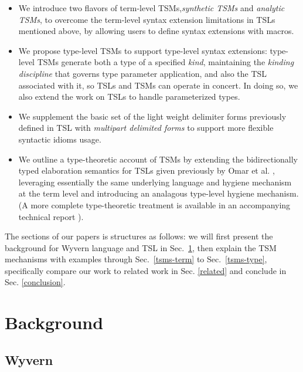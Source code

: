 \documentclass{sig-alternate}[10pt]
\begin{document}
\begin{itemize}[noitemsep]
\item We introduce two flavors of term-level TSMs,\emph{synthetic TSMs} and \emph{analytic TSMs}, to overcome the term-level syntax extension limitations in TSLs mentioned above, by allowing users to define syntax extensions with macros.
\item We propose type-level TSMs to support type-level syntax extensions: type-level TSMs generate both a type of a specified \emph{kind}, maintaining the \emph{kinding discipline} that governs type parameter application, and also the TSL associated with it, so TSLs and TSMs can operate in concert. In doing so, we also extend the work on TSLs to handle parameterized types. %
\item We supplement the basic set of the light weight delimiter forms previously defined in TSL with \emph{multipart delimited forms} to support more flexible syntactic idioms usage.
\item We outline a type-theoretic account of TSMs by extending the bidirectionally typed elaboration semantics for TSLs given previously by Omar et al. \cite{TSLs}, leveraging essentially the same underlying language and hygiene mechanism at the term level and introducing an analagous type-level hygiene mechanism. (A more complete type-theoretic treatment is available in an accompanying technical report \cite{sac15tr}).%
\end{itemize}

The sections of our papers is structures as follows: we will first present the background for Wyvern language and TSL in Sec.~\ref{background}, then explain the TSM mechanisms with examples through Sec.~\ref{tsms-term} to Sec.~\ref{tsms-type}, specifically compare our work to related work in Sec. \ref{related} and conclude in Sec. \ref{conclusion}.

\section{Background}\label{background}
\subsection{Wyvern}
\end{document}
